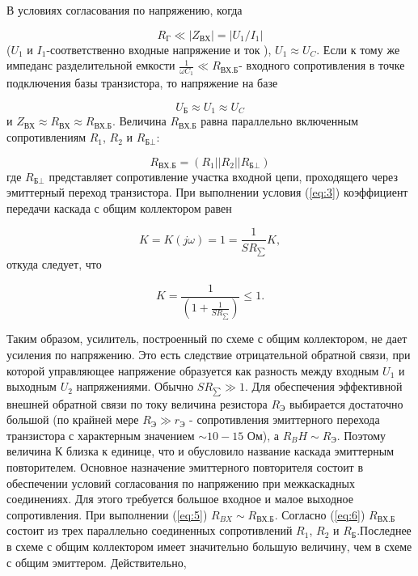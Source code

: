 В условиях согласования по напряжению, когда

$$R_{\text{Г}} \ll |Z_{\text{ВХ}}|=|U_1/I_1|$$
($U_1$ и $I_1$-соответственно входные напряжение и ток ), $U_1 \approx U_C$. Если
к тому же импеданс разделительной емкости $\frac{1}{\omega C_1}\ll R_{\text{ВХ.Б}}$- входного сопротивления в точке подключения базы транзистора, то напряжение на базе

\begin{equation}
	U_{\text{Б}} \approx U_1 \approx U_C
	\label{eq:5}
\end{equation}
и $Z_{\text{ВХ}} \approx R_{\text{ВХ}} \approx R_{\text{ВХ.Б}}$. Величина $R_{\text{ВХ.Б}}$ равна параллельно включенным сопротивлениям $R_1$, $R_2$ и $R_{\text{Б} \bot}$:

\begin{equation}
	R_{\text{ВХ.Б}}=(R_1||R_2||R_{\text{Б} \bot})
	\label{eq:6}
\end{equation}
где $R_{\text{Б} \bot}$ представляет сопротивление участка входной цепи, проходящего через эмиттерный переход транзистора. При выполнении условия (\ref{eq:3}) коэффициент передачи каскада с общим коллектором равен 

$$K=K(j\omega)=1=\frac{1}{SR_{\sum}}K,$$
откуда следует, что

$$K=\frac{1}{(1+\frac{1}{SR_{\sum}})}\leq 1.$$

Таким образом, усилитель, построенный по схеме с общим коллектором, не дает усиления по напряжению. Это есть следствие отрицательной обратной связи, при которой управляющее
напряжение образуется как разность между входным $U_1$ и выходным $U_2$ напряжениями. Обычно $SR_{\sum}\gg1$. Для обеспечения эффективной внешней обратной связи по току величина резистора $R_{\text{Э}}$ выбирается достаточно большой (по крайней мере $R_{\text{Э}} \gg r_{\text{Э}}$ - сопротивления эмиттерного перехода транзистора с характерным значением $\sim 10-15$ Ом), а $R_BH \sim R_{\text{Э}}$. Поэтому величина К близка к единице, что и обусловило название каскада эмиттерным повторителем. Основное назначение эмиттерного повторителя состоит в обеспечении условий согласования по напряжению при межкаскадных соединениях. Для этого требуется большое входное и малое выходное сопротивления. При выполнении (\ref{eq:5}) $R_{BX} \sim R_{\text{ВХ.Б}}$. Согласно (\ref{eq:6})  $R_{\text{ВХ.Б}}$ состоит из трех параллельно соединенных сопротивлений $R_1$, $R_2$ и $R_{\text{Б}}$.Последнее в схеме с общим коллектором имеет значительно большую величину, чем в схеме с общим эмиттером. Действительно,

